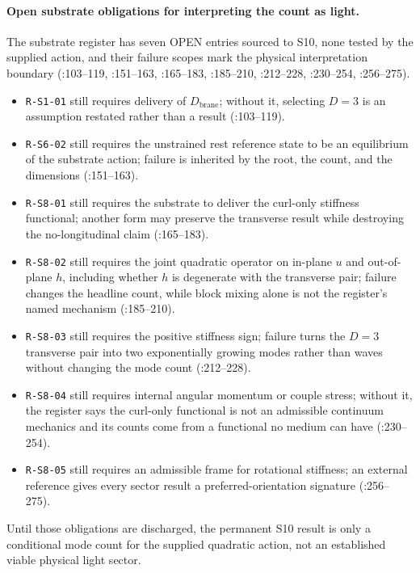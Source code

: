 \paragraph{Open substrate obligations for interpreting the count as light.}
The substrate register has seven OPEN entries sourced to S10, none tested by
the supplied action, and their failure scopes mark the physical interpretation
boundary
(:103--119,
:151--163, :165--183, :185--210, :212--228, :230--254, :256--275).
\begin{itemize}
\item \texttt{R-S1-01} still requires delivery of
\(D_{\mathrm{brane}}\); without it, selecting \(D=3\) is an assumption restated
rather than a result
(:103--119).
\item \texttt{R-S6-02} still requires the unstrained rest reference state to
be an equilibrium of the substrate action; failure is inherited by the root,
the count, and the dimensions
(:151--163).
\item \texttt{R-S8-01} still requires the substrate to deliver the curl-only
stiffness functional; another form may preserve the transverse result while
destroying the no-longitudinal claim
(:165--183).
\item \texttt{R-S8-02} still requires the joint quadratic operator on in-plane
\(u\) and out-of-plane \(h\), including whether \(h\) is degenerate with the
transverse pair; failure changes the headline count, while block mixing alone is
not the register's named mechanism
(:185--210).
\item \texttt{R-S8-03} still requires the positive stiffness sign; failure
turns the \(D=3\) transverse pair into two exponentially growing modes rather
than waves without changing the mode count
(:212--228).
\item \texttt{R-S8-04} still requires internal angular momentum or couple
stress; without it, the register says the curl-only functional is not an
admissible continuum mechanics and its counts come from a functional no medium
can have
(:230--254).
\item \texttt{R-S8-05} still requires an admissible frame for rotational
stiffness; an external reference gives every sector result a
preferred-orientation signature
(:256--275).
\end{itemize}
Until those obligations are discharged, the permanent S10 result is only a
conditional mode count for the supplied quadratic action, not an established
viable physical light sector.
